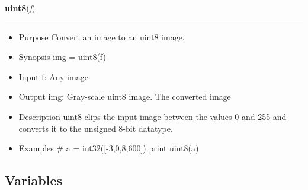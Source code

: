     \begin{boxedminipage}{\textwidth}

    \raggedright \textbf{uint8}(\textit{f})

    \vspace{-1.5ex}

    \rule{\textwidth}{0.5\fboxrule}
    \begin{itemize}
    \setlength{\parskip}{0.6ex}
      \item Purpose Convert an image to an uint8 image.

      \item Synopsis img = uint8(f)

      \item Input f: Any image

      \item Output img: Gray-scale uint8 image. The converted image

      \item Description uint8 clips the input image between the values 0 and 
        255 and converts it to the unsigned 8-bit datatype.

      \item Examples \# a = int32([-3,0,8,600]) print uint8(a)

    \end{itemize}

    \vspace{1ex}

    \end{boxedminipage}



  \subsection{Variables}

